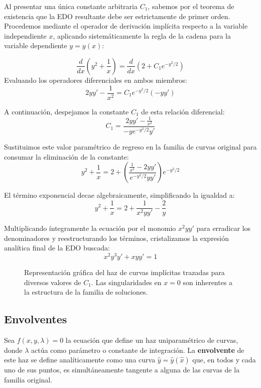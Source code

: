 \begin{tcolorbox}
Al presentar una única constante arbitraria $C_1$, sabemos por el teorema de existencia que la EDO resultante debe ser estrictamente de primer orden. Procedemos mediante el operador de derivación implícita respecto a la variable independiente $x$, aplicando sistemáticamente la regla de la cadena para la variable dependiente $y = y(x)$:

$$ \frac{d}{dx}\left(y^2 + \frac{1}{x}\right) = \frac{d}{dx}\left(2 + C_1 e^{-y^2/2}\right) $$
Evaluando los operadores diferenciales en ambos miembros:
$$ 2yy' - \frac{1}{x^2} = C_1 e^{-y^2/2} (-yy') $$

A continuación, despejamos la constante $C_1$ de esta relación diferencial:
$$ C_1 = \frac{2yy' - \frac{1}{x^2}}{-y e^{-y^2/2} y'} $$

Sustituimos este valor paramétrico de regreso en la familia de curvas original para consumar la eliminación de la constante:
$$ y^2 + \frac{1}{x} = 2 + \left( \frac{\frac{1}{x^2} - 2yy'}{e^{-y^2/2} yy'} \right) e^{-y^2/2} $$

El término exponencial decae algebraicamente, simplificando la igualdad a:
$$ y^2 + \frac{1}{x} = 2 + \frac{1}{x^2 yy'} - \frac{2}{y} $$

Multiplicando íntegramente la ecuación por el monomio $x^2 yy'$ para erradicar los denominadores y reestructurando los términos, cristalizamos la expresión analítica final de la EDO buscada:
$$ x^2 y^3 y' + x y y' = 1 $$

\begin{figure}[H]
    \centering
    
    \caption{Representación gráfica del haz de curvas implícitas trazadas para diversos valores de $C_1$. Las singularidades en $x=0$ son inherentes a la estructura de la familia de soluciones.}
\end{figure}
\end{tcolorbox}

\subsection{Envolventes}

Sea $f(x,y,\lambda)=0$ la ecuación que define un haz uniparamétrico de curvas, donde $\lambda$ actúa como parámetro o constante de integración. La \textbf{envolvente} de este haz se define analíticamente como una curva $\hat{y} = \hat{y}(\hat{x})$ que, en todos y cada uno de sus puntos, es simultáneamente tangente a alguna de las curvas de la familia original.

